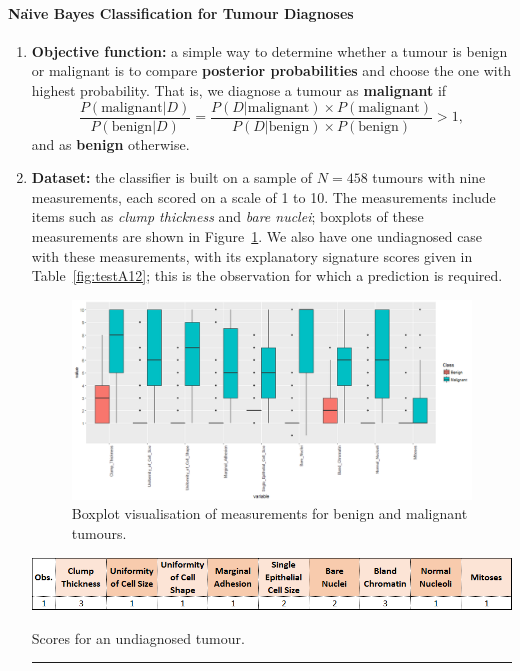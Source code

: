 \paragraph{Na\"{\i}ve Bayes Classification for Tumour Diagnoses}
\begin{enumerate}[noitemsep]
    \item \textbf{Objective function:} a simple way to determine whether a tumour is benign or malignant is to compare \textbf{posterior probabilities} and choose the one with highest probability. That is, we diagnose a tumour as \textbf{malignant} if 
        \begin{equation*}
        \frac{P(\textrm{malignant}|D)}{P(\textrm{benign}|D)}=\frac{P(D|\textrm{malignant})\times P(\textrm{malignant})}{P(D|\textrm{benign})\times P(\textrm{benign})}>1,
    \end{equation*}
    and as \textbf{benign} otherwise. 
    
    \item \textbf{Dataset:} the classifier is built on a sample of $N=458$ tumours with nine measurements, each scored on a scale of 1 to 10. The measurements include items such as \textit{clump thickness} and \textit{bare nuclei}; boxplots of these measurements are shown in Figure~\ref{fig:testA10}. We also have one undiagnosed case with these measurements, with its explanatory signature scores given in Table~\ref{fig:testA12}; this is the observation for which a prediction is required.    
    \begin{figure}[!t]
    \centering
      \includegraphics[width=\textwidth]{images/SA/testA10.png}
      \caption[\small Visualisation of tumour measurements]{\small Boxplot visualisation of measurements for benign and malignant tumours.}
      \label{fig:testA10}
    \end{figure}
    
    \begin{table}[!t]
    \centering
      \includegraphics[width=\textwidth]{images/SA/testA12.png}
      \caption[\small Scores for an undiagnosed tumour]{Scores for an undiagnosed tumour.}
      \label{fig:testA12}\hrule
    \end{table}


\end{enumerate}
